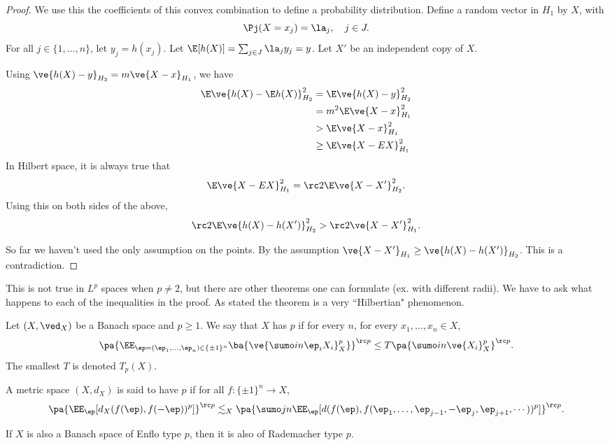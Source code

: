 \begin{proof}
We use this the coefficients of this convex combination to define a probability distribution. Define a random vector in $H_1$ by $X$, with
\[
\Pj(X=x_j) = \la_j,\quad j\in J.
\]
For all $j\in \{1,\ldots, n\}$, let $y_j=h(x_j)$. Let $\E[h(X)] = \sum_{j\in J} \la_jy_j=y$. Let $X'$ be an independent copy of $X$.

Using $\ve{h(X)-y}_{H_2} = m\ve{X-x}_{H_1}$, we have
\begin{align}%
\E\ve{h(X)-\E h(X)}_{H_2}^2 & =\E \ve{h(X) - y}_{H_2}^2\\
&=m^2 \E\ve{X-x}_{H_1}^2\\
&> \E\ve{X-x}_{H_1}^2\\
&\ge \E\ve{X-EX}_{H_1}^2 \label{eq:kir1}
\end{align}
In Hilbert space, it is always true that 
\[
\E\ve{X-EX}_{H_1}^2 = \rc2 \E\ve{X-X'}_{H_2}^2.
\]
Using this on both sides of the above,
\[
\rc 2 \E\ve{h(X)-h(X')}_{H_2}^2 > \rc2\ve{X-X'}_{H_1}^2. 
\]

So far we haven't used the only assumption on the points. By the assumption $\ve{X-X'}_{H_1} \ge \ve{h(X)-h(X')}_{H_2}$. This is a contradiction.
\end{proof}
This is not true in $L^p$ spaces when $p\ne 2$, but there are other theorems one can formulate (ex. with different radii). We have to ask what happens to each of the inequalities in the proof.
As stated the theorem is a very ``Hilbertian" phenomenon.

\begin{df}
Let $(X,\ved_X)$ be a Banach space and $p\ge 1$. We say that $X$ has  $p$ if for every $n$, for every $x_1,\ldots, x_n\in X$, 
\[\pa{\EE_{\ep=(\ep_1,\ldots, \ep_n)\in \{\pm 1\}^n}\ba{\ve{\sumo in\ep_iX_i}^p_X}}^{\rc p}\le T\pa{\sumo in \ve{X_i}_X^p}^{\rc p}.
\] 
The smallest $T$ is denoted $T_p(X)$.
\end{df}
\begin{df*}
A metric space $(X,d_X)$ is said to have  $p$ if for all $f:\{\pm 1\}^n\to X$,
\[
\pa{
\EE_{\ep} [d_X(f(\ep),f(-\ep))^p]
}^{\rc p}\lesssim_X
\pa{
\sumo jn \EE_{\ep} [d(f(\ep), f(\ep_1,\ldots,\ep_{j-1}, -\ep_j, \ep_{j+1},\cdots))^p]
}^{\rc p}.
\]
\end{df*}
If $X$ is also a Banach space of Enflo type $p$, then it is also of Rademacher type $p$. %

